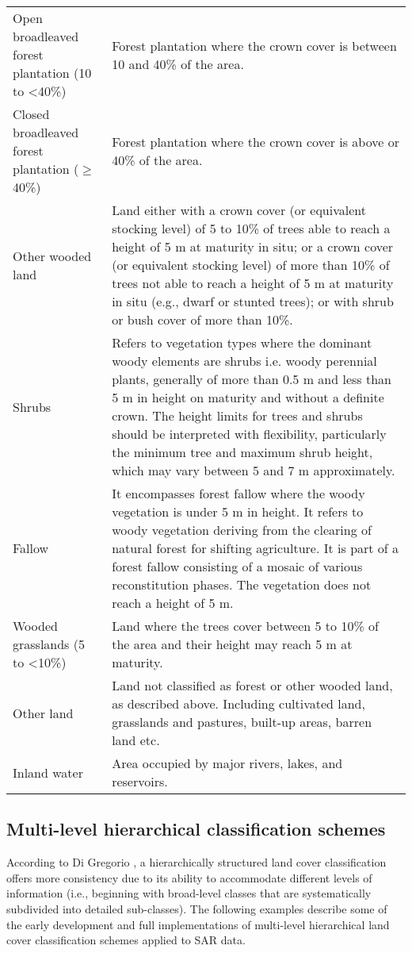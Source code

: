 \begin{spacing}{1.0}
\begin{longtable}[h!]{ p{3.5cm} p{10.5cm} }
	Open broadleaved forest plantation (10 to \textless 40\%) & Forest plantation where the crown cover is between 10 and 40\% of the area.\\[18pt]
	Closed broadleaved forest plantation ($\geq$ 40\%) & Forest plantation where the crown cover is above or 40\% of the area.\\[18pt]
	Other wooded land & Land either with a crown cover (or equivalent stocking level) of 5 to 10\% of trees able to reach a height of 5 m at maturity in situ; or a crown cover (or equivalent stocking level) of more than 10\% of trees not able to reach a height of 5 m at maturity in situ (e.g., dwarf or stunted trees); or with shrub or bush cover of more than 10\%.\\[5pt]
	Shrubs & Refers to vegetation types where the dominant woody elements are shrubs i.e. woody perennial plants, generally of more than 0.5 m and less than 5 m in height on maturity and without a definite crown. The height limits for trees and shrubs should be interpreted with flexibility, particularly the minimum tree and maximum shrub height, which may vary between 5 and 7 m approximately.\\[5pt]
	Fallow & It encompasses forest fallow where the woody vegetation is under 5 m in height. It refers to woody vegetation deriving from the clearing of natural forest for shifting agriculture. It is part of a forest fallow consisting of a mosaic of various reconstitution phases. The vegetation does not reach a height of 5 m.\\[5pt]
	Wooded grasslands (5 to \textless 10\%) & Land where the trees cover between 5 to 10\% of the area and their height may reach 5 m at maturity.\\[3pt]
	Other land & Land not classified as forest or other wooded land, as described above. Including cultivated land, grasslands and pastures, built-up areas, barren land etc.\\[5pt]
	Inland water & Area occupied by major rivers, lakes, and reservoirs.\\[3pt]
	
    \bottomrule
\end{longtable}
\end{spacing}

\subsection{Multi-level hierarchical classification schemes}

According to Di Gregorio \citeyearpar{di_gregorio_land_2005}, a hierarchically structured land cover classification offers more consistency due to its ability to accommodate different levels of information (i.e., beginning with broad-level classes that are systematically subdivided into detailed sub-classes). The following examples describe some of the early development and full implementations of multi-level hierarchical land cover classification schemes applied to SAR data.

